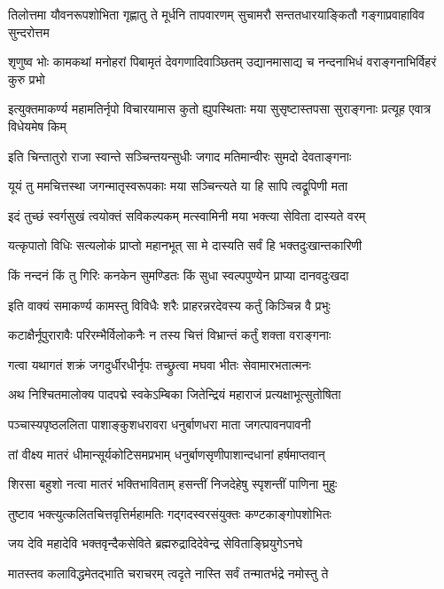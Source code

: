 \fourlineindentedshloka
{तिलोत्तमा यौवनरूपशोभिता}
{गृह्णातु ते मूर्धनि तापवारणम्}
{सुचामरौ सन्ततधारयाङ्कितौ}
{गङ्गाप्रवाहाविव सुन्दरोत्तम}%

\fourlineindentedshloka
{शृणुष्व भोः कामकथां मनोहरां}
{पिबामृतं देवगणादिवाञ्छितम्}
{उद्यानमासाद्य च नन्दनाभिधं}
{वराङ्गनाभिर्विहरं कुरु प्रभो}%

\fourlineindentedshloka
{इत्युक्तमाकर्ण्य महामतिर्नृपो}
{विचारयामास कुतो ह्युपस्थिताः}
{मया सुसृष्टास्तपसा सुराङ्गनाः}
{प्रत्यूह एवात्र विधेयमेष किम्}%

\twolineshloka
{इति चिन्तातुरो राजा स्वान्ते सञ्चिन्तयन्सुधीः}
{जगाद मतिमान्वीरः सुमदो देवताङ्गनाः}%

\twolineshloka
{यूयं तु ममचित्तस्था जगन्मातृस्वरूपकाः}
{मया सञ्चिन्त्यते या हि सापि त्वद्रूपिणी मता}%

\twolineshloka
{इदं तुच्छं स्वर्गसुखं त्वयोक्तं सविकल्पकम्}
{मत्स्वामिनी मया भक्त्या सेविता दास्यते वरम्}%

\twolineshloka
{यत्कृपातो विधिः सत्यलोकं प्राप्तो महानभूत्}
{सा मे दास्यति सर्वं हि भक्तदुःखान्तकारिणी}%

\twolineshloka
{किं नन्दनं किं तु गिरिः कनकेन सुमण्डितः}
{किं सुधा स्वल्पपुण्येन प्राप्या दानवदुःखदा}%

\twolineshloka
{इति वाक्यं समाकर्ण्य कामस्तु विविधैः शरैः}
{प्राहरन्नरदेवस्य कर्तुं किञ्चिन्न वै प्रभुः}%

\twolineshloka
{कटाक्षैर्नूपुरारावैः परिरम्भैर्विलोकनैः}
{न तस्य चित्तं विभ्रान्तं कर्तुं शक्ता वराङ्गनाः}%

\twolineshloka
{गत्वा यथागतं शक्रं जगदुर्धीरधीर्नृपः}
{तच्छ्रुत्वा मघवा भीतः सेवामारभतात्मनः}%

\twolineshloka
{अथ निश्चितमालोक्य पादपद्मे स्वकेऽम्बिका}
{जितेन्द्रियं महाराजं प्रत्यक्षाभूत्सुतोषिता}%

\twolineshloka
{पञ्चास्यपृष्ठललिता पाशाङ्कुशधरावरा}
{धनुर्बाणधरा माता जगत्पावनपावनी}%

\twolineshloka
{तां वीक्ष्य मातरं धीमान्सूर्यकोटिसमप्रभाम्}
{धनुर्बाणसृणीपाशान्दधानां हर्षमाप्तवान्}%

\twolineshloka
{शिरसा बहुशो नत्वा मातरं भक्तिभाविताम्}
{हसन्तीं निजदेहेषु स्पृशन्तीं पाणिना मुहुः}%

\twolineshloka
{तुष्टाव भक्त्युत्कलितचित्तवृत्तिर्महामतिः}
{गद्गदस्वरसंयुक्तः कण्टकाङ्गोपशोभितः}%

\twolineshloka
{जय देवि महादेवि भक्तवृन्दैकसेविते}
{ब्रह्मरुद्रादिदेवेन्द्र सेविताङ्घ्रियुगेऽनघे}%

\twolineshloka
{मातस्तव कलाविद्धमेतद्भाति चराचरम्}
{त्वदृते नास्ति सर्वं तन्मातर्भद्रे नमोस्तु ते}%

